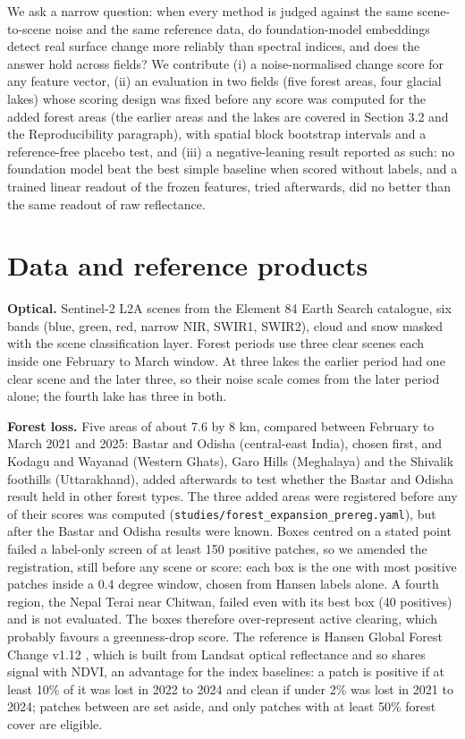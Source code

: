 \documentclass[11pt]{article}
\begin{document}
We ask a narrow question: when every method is judged against the same scene-to-scene noise and the same reference data, do foundation-model embeddings detect real surface change more reliably than spectral indices, and does the answer hold across fields? We contribute (i) a noise-normalised change score for any feature vector, (ii) an evaluation in two fields (five forest areas, four glacial lakes) whose scoring design was fixed before any score was computed for the added forest areas (the earlier areas and the lakes are covered in Section 3.2 and the Reproducibility paragraph), with spatial block bootstrap intervals and a reference-free placebo test, and (iii) a negative-leaning result reported as such: no foundation model beat the best simple baseline when scored without labels, and a trained linear readout of the frozen features, tried afterwards, did no better than the same readout of raw reflectance.

\section{Data and reference products}

\textbf{Optical.} Sentinel-2 L2A scenes from the Element 84 Earth Search catalogue, six bands (blue, green, red, narrow NIR, SWIR1, SWIR2), cloud and snow masked with the scene classification layer. Forest periods use three clear scenes each inside one February to March window. At three lakes the earlier period had one clear scene and the later three, so their noise scale comes from the later period alone; the fourth lake has three in both.

\textbf{Forest loss.} Five areas of about 7.6 by 8 km, compared between February to March 2021 and 2025: Bastar and Odisha (central-east India), chosen first, and Kodagu and Wayanad (Western Ghats), Garo Hills (Meghalaya) and the Shivalik foothills (Uttarakhand), added afterwards to test whether the Bastar and Odisha result held in other forest types. The three added areas were registered before any of their scores was computed (\texttt{studies/forest\_expansion\_prereg.yaml}), but after the Bastar and Odisha results were known. Boxes centred on a stated point failed a label-only screen of at least 150 positive patches, so we amended the registration, still before any scene or score: each box is the one with most positive patches inside a 0.4 degree window, chosen from Hansen labels alone. A fourth region, the Nepal Terai near Chitwan, failed even with its best box (40 positives) and is not evaluated. The boxes therefore over-represent active clearing, which probably favours a greenness-drop score. The reference is Hansen Global Forest Change v1.12 \cite{hansen2013}, which is built from Landsat optical reflectance and so shares signal with NDVI, an advantage for the index baselines: a patch is positive if at least 10\% of it was lost in 2022 to 2024 and clean if under 2\% was lost in 2021 to 2024; patches between are set aside, and only patches with at least 50\% forest cover are eligible.
\end{document}
